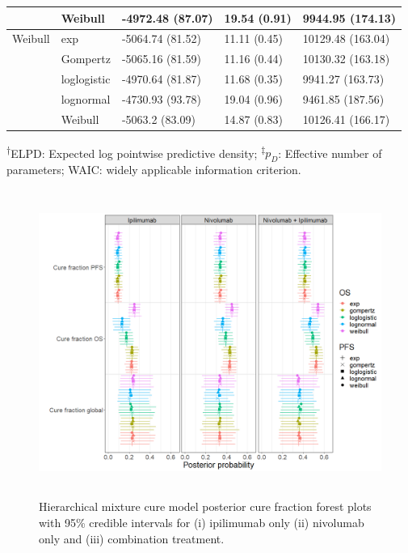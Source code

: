 \documentclass[AMA,STIX1COL]{WileyNJD-v2}
\begin{document}
\begin{table}[!ht]
\begin{tabular}{l|l|l|l|l}
\hline
 & Weibull & -4972.48 (87.07) & 19.54 (0.91) & 9944.95 (174.13)\\
\hline
Weibull & exp & -5064.74 (81.52) & 11.11 (0.45) & 10129.48 (163.04)\\
\hline
 & Gompertz & -5065.16 (81.59) & 11.16 (0.44) & 10130.32 (163.18)\\
\hline
 & loglogistic & -4970.64 (81.87) & 11.68 (0.35) & 9941.27 (163.73)\\
\hline
 & lognormal & -4730.93 (93.78) & 19.04 (0.96) & 9461.85 (187.56)\\
\hline
 & Weibull & -5063.2 (83.09) & 14.87 (0.83) & 10126.41 (166.17)\\
\hline
\end{tabular}
\begin{tablenotes}%
\textsuperscript{$\dagger$}ELPD: Expected log pointwise predictive density;
\textsuperscript{$\ddagger$}$p_D$: Effective number of parameters;
WAIC: widely applicable information criterion.
\end{tablenotes}
\end{table}

\begin{figure}[hbt!]
\centering
\includegraphics[height=10cm, width=0.9\linewidth]{forest_plot_multimcm.png}
\caption{\label{fig:cf_forest_all_tx} Hierarchical mixture cure model posterior cure fraction forest plots with 95\% credible intervals for (i) ipilimumab only (ii) nivolumab only and (iii) combination treatment.}
\end{figure}
\end{document}
